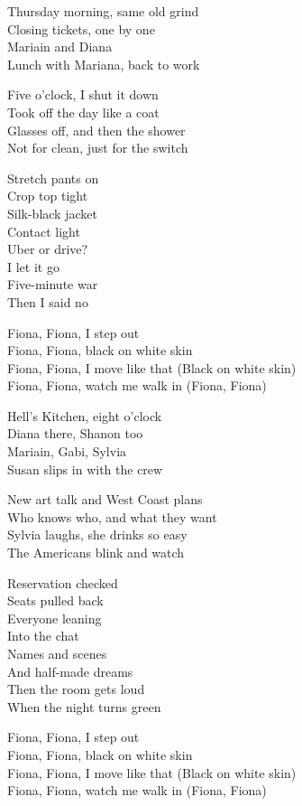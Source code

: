 \begin{lyrics}
Thursday morning, same old grind\\
Closing tickets, one by one\\
Mariain and Diana\\
Lunch with Mariana, back to work

Five o'clock, I shut it down\\
Took off the day like a coat\\
Glasses off, and then the shower\\
Not for clean, just for the switch

Stretch pants on\\
Crop top tight\\
Silk-black jacket\\
Contact light\\
Uber or drive?\\
I let it go\\
Five-minute war\\
Then I said no

Fiona, Fiona, I step out\\
Fiona, Fiona, black on white skin\\
Fiona, Fiona, I move like that
(Black on white skin)\\
Fiona, Fiona, watch me walk in
(Fiona, Fiona)

Hell's Kitchen, eight o'clock\\
Diana there, Shanon too\\
Mariain, Gabi, Sylvia\\
Susan slips in with the crew

New art talk and West Coast plans\\
Who knows who, and what they want\\
Sylvia laughs, she drinks so easy\\
The Americans blink and watch

Reservation checked\\
Seats pulled back\\
Everyone leaning\\
Into the chat\\
Names and scenes\\
And half-made dreams\\
Then the room gets loud\\
When the night turns green

Fiona, Fiona, I step out\\
Fiona, Fiona, black on white skin\\
Fiona, Fiona, I move like that
(Black on white skin)\\
Fiona, Fiona, watch me walk in
(Fiona, Fiona)


\end{lyrics}
